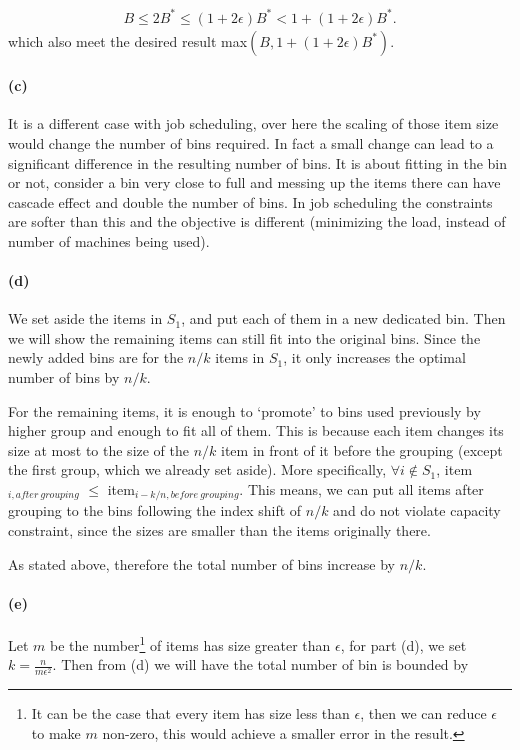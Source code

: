 \documentclass[12pt]{article}
\begin{document}
\begin{align*}
B \leq 2B^* \leq (1 + 2\epsilon)B^* < 1 + (1 + 2\epsilon)B^*.
\end{align*}
which also meet the desired result max$(B, 1 + (1 + 2\epsilon) B^*)$.

\paragraph{(c)}
It is a different case with job scheduling, over here the scaling of those item size would change the number of bins required. In fact a small change can lead to a significant difference in the resulting number of bins. It is about fitting in the bin or not, consider a bin very close to full and messing up the items there can have cascade effect and double the number of bins. In job scheduling the constraints are softer than this and the objective is different (minimizing the load, instead of number of machines being used).

\paragraph{(d)} We set aside the items in $S_1$, and put each of them in a new dedicated bin. Then we will show the remaining items can still fit into the original bins. Since the newly added bins are for the $n/k$ items in $S_1$, it only increases the optimal number of bins by $n/k$. 

For the remaining items, it is enough to `promote' to bins used previously by higher group and enough to fit all of them. This is because each item changes its size at most to the size of the $n/k$ item in front of it before the grouping (except the first group, which we already set aside). More specifically, $\forall i \notin S_1$, item$_{i, after\:grouping}$ $\leq$ item$_{i - k/n, before\:grouping}$. This means, we can put all items after grouping to the bins following the index shift of $n/k$ and do not violate capacity constraint, since the sizes are smaller than the items originally there. 

As stated above, therefore the total number of bins increase by $n/k$. 
\paragraph{(e)} Let $m$ be the number\footnote{It can be the case that every item has size less than $\epsilon$, then we can reduce $\epsilon$ to make $m$ non-zero, this would achieve a smaller error in the result.} of items has size greater than $\epsilon$, for part (d), we set $k = \frac{n}{m\epsilon^2}$. Then from (d) we will have the total number of bin is bounded by 
\end{document}
